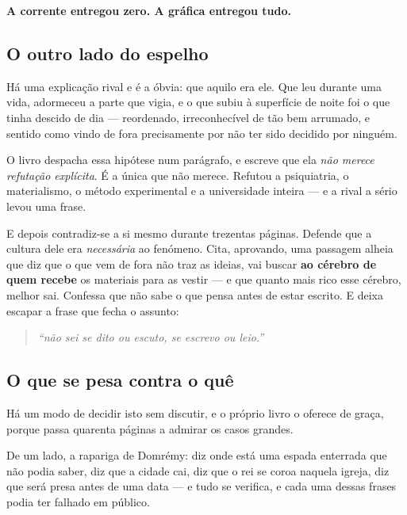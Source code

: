 \documentclass[livro.tex]{subfiles}
\begin{document}
\medskip

\textbf{A corrente entregou zero. A gráfica entregou tudo.}

\subsection*{O outro lado do espelho}

Há uma explicação rival e é a óbvia: que aquilo era ele. Que leu durante uma vida, adormeceu a
parte que vigia, e o que subiu à superfície de noite foi o que tinha descido de dia --- reordenado,
irreconhecível de tão bem arrumado, e sentido como vindo de fora precisamente por não ter sido
decidido por ninguém.

\medskip

O livro despacha essa hipótese num parágrafo, e escreve que ela \emph{não merece refutação
explícita}. É a única que não merece. Refutou a psiquiatria, o materialismo, o método
experimental e a universidade inteira --- e a rival a sério levou uma frase.

\medskip

E depois contradiz-se a si mesmo durante trezentas páginas. Defende que a cultura dele era
\emph{necessária} ao fenómeno. Cita, aprovando, uma passagem alheia que diz que o que vem de fora
não traz as ideias, vai buscar \textbf{ao cérebro de quem recebe} os materiais para as vestir ---
e que quanto mais rico esse cérebro, melhor sai. Confessa que não sabe o que pensa antes de estar
escrito. E deixa escapar a frase que fecha o assunto:

\begin{quote}
\emph{``não sei se dito ou escuto, se escrevo ou leio.''}
\end{quote}

\subsection*{O que se pesa contra o quê}

Há um modo de decidir isto sem discutir, e o próprio livro o oferece de graça, porque passa
quarenta páginas a admirar os casos grandes.

\medskip

De um lado, a rapariga de Domrémy: diz onde está uma espada enterrada que não podia saber, diz que
a cidade cai, diz que o rei se coroa naquela igreja, diz que será presa antes de uma data --- e
tudo se verifica, e cada uma dessas frases podia ter falhado em público.
\end{document}
